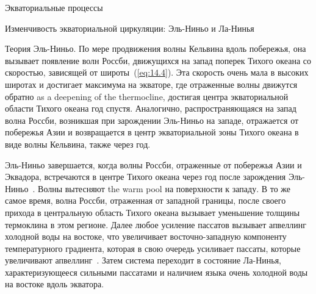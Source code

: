 \begin{chapter}{Экваториальные процессы}
\begin{section}{Изменчивость экваториальной циркуляции: Эль-Ниньо и Ла-Нинья}
\begin{paragraph}{Теория Эль-Ниньо.}
По мере продвижения волны Кельвина вдоль побережья,
она вызывает появление волн Россби, движущихся на запад поперек Тихого океана
со скоростью, зависящей от широты~(\ref{eq:14.4}). Эта скорость очень мала
в высоких широтах и достигает максимума на экваторе, где отраженные волны
движутся обратно as a deepening of the thermocline,
достигая центра экваториальной области Тихого океана год спустя. 
Аналогично, распространяющаяся на запад волна Россби,
возникшая при зарождении Эль-Ниньо на западе, отражается от побережья Азии
и возвращается в центр экваториальной зоны Тихого океана в виде волны Кельвина,
также через год.
%

Эль-Ниньо завершается, когда волны Россби, отраженные от побережья Азии
и Эквадора, встречаются в центре Тихого океана через год после 
зарождения Эль-Ниньо~\cite{Picaut:1997}. Волны вытесняют
the warm pool на поверхности к западу. В то же самое время, волна 
Россби, отраженная от западной границы, после своего
прихода в центральную область Тихого океана вызывает уменьшение толщины
термоклина в этом регионе. Далее любое 
усиление пассатов вызывает апвеллинг 
холодной воды на востоке, что увеличивает восточно-западную компоненту 
температурного градиента, которая в свою очередь усиливает пассаты,
которые увеличивают апвеллинг~\cite{Takayabu:1999}. Затем система переходит
в состояние Ла-Нинья, характеризующееся сильными пассатами и наличием
языка очень холодной воды на востоке вдоль экватора.
%


\end{paragraph}
\end{section}
\end{chapter}
